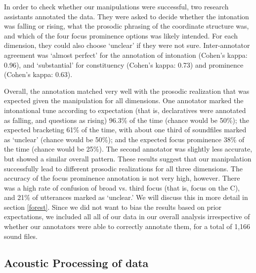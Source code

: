 \documentclass[preprint,review,12pt,authoryear,times]{elsarticle}
\begin{document}
In order to check whether our manipulations were successful, two research assistants annotated the data. They were asked to decide whether the intonation was falling or rising, what the prosodic phrasing of the coordinate structure was, and which of the four focus prominence options was likely intended. For each dimension, they could also choose `unclear' if they were not sure. Inter-annotator agreement was `almost perfect' for the annotation of intonation (Cohen's kappa: 0.96), and `substantial' for constituency (Cohen's kappa: 0.73) and prominence (Cohen's kappa: 0.63). 

Overall, the annotation matched very well with the prosodic realization that was expected given the manipulation for all dimensions. One annotator marked the intonational tune according to expectation (that is, declaratives were annotated as falling, and questions as rising) 96.3\% of the time (chance would be 50\%); the expected bracketing  61\% of the time, with about one third of soundfiles marked as `unclear' (chance would be 50\%); and the expected focus prominence  38\% of the time (chance would be 25\%). The second annotator was slightly less accurate, but showed a similar overall pattern. These results suggest that our manipulation successfully lead to different prosodic realizations for all three dimensions. The accuracy of the focus prominence annotation is not very high, however. There was a high rate of confusion of broad vs. third focus (that is, focus on the C), and 21\% of utterances marked as `unclear.' We will discuss this in more detail in section \ref{forest}. Since we did not want to bias the results based on prior expectations, we included all all of our data in our overall analysis irrespective of whether our annotators were able to correctly annotate them, for a total of 1,166 sound files. 


\subsection{Acoustic Processing of data}
\end{document}
